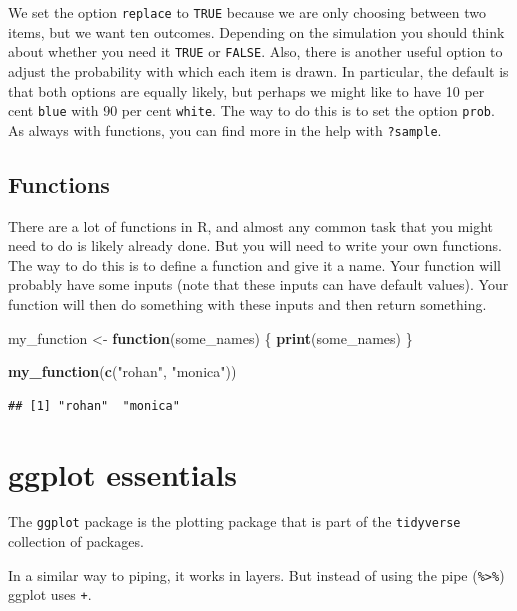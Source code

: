\documentclass[
]{book}
\newenvironment{Shaded}{\begin{snugshade}}{\end{snugshade}}
\newcommand{\ControlFlowTok}[1]{\textcolor[rgb]{0.13,0.29,0.53}{\textbf{#1}}}
\newcommand{\KeywordTok}[1]{\textcolor[rgb]{0.13,0.29,0.53}{\textbf{#1}}}
\newcommand{\NormalTok}[1]{#1}
\newcommand{\StringTok}[1]{\textcolor[rgb]{0.31,0.60,0.02}{#1}}
\begin{document}
We set the option \texttt{replace} to \texttt{TRUE} because we are only choosing between two items, but we want ten outcomes. Depending on the simulation you should think about whether you need it \texttt{TRUE} or \texttt{FALSE}. Also, there is another useful option to adjust the probability with which each item is drawn. In particular, the default is that both options are equally likely, but perhaps we might like to have 10 per cent \texttt{blue} with 90 per cent \texttt{white}. The way to do this is to set the option \texttt{prob}. As always with functions, you can find more in the help with \texttt{?sample}.

\hypertarget{functions}{%
\subsection{Functions}\label{functions}}

There are a lot of functions in R, and almost any common task that you might need to do is likely already done. But you will need to write your own functions. The way to do this is to define a function and give it a name. Your function will probably have some inputs (note that these inputs can have default values). Your function will then do something with these inputs and then return something.

\begin{Shaded}
\begin{Highlighting}[]
\NormalTok{my_function <-}\StringTok{ }\ControlFlowTok{function}\NormalTok{(some_names) \{}
  \KeywordTok{print}\NormalTok{(some_names)}
\NormalTok{\}}

\KeywordTok{my_function}\NormalTok{(}\KeywordTok{c}\NormalTok{(}\StringTok{"rohan"}\NormalTok{, }\StringTok{"monica"}\NormalTok{))}
\end{Highlighting}
\end{Shaded}

\begin{verbatim}
## [1] "rohan"  "monica"
\end{verbatim}

\hypertarget{ggplot-essentials}{%
\section{ggplot essentials}\label{ggplot-essentials}}

The \texttt{ggplot} package is the plotting package that is part of the \texttt{tidyverse} collection of packages.

In a similar way to piping, it works in layers. But instead of using the pipe (\texttt{\%\textgreater{}\%}) ggplot uses \texttt{+}.
\end{document}
